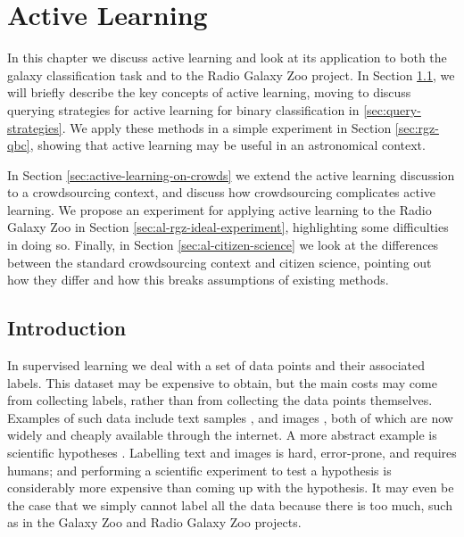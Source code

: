 
\chapter{Active Learning}
\label{cha:active-learning}

In this chapter we discuss active learning and look at its application to both
the galaxy classification task and to the Radio Galaxy Zoo project. In Section
\ref{sec:intro-active-learning}, we will briefly describe the key concepts of
active learning, moving to discuss querying strategies for active learning for
binary classification in \ref{sec:query-strategies}. We apply these methods in a
simple experiment in Section \ref{sec:rgz-qbc}, showing that active learning may
be useful in an astronomical context.

In Section \ref{sec:active-learning-on-crowds} we extend the active learning
discussion to a crowdsourcing context, and discuss how crowdsourcing complicates
active learning. We propose an experiment for applying active learning to the
Radio Galaxy Zoo in Section \ref{sec:al-rgz-ideal-experiment}, highlighting some
difficulties in doing so. Finally, in Section \ref{sec:al-citizen-science} we
look at the differences between the standard crowdsourcing context and citizen
science, pointing out how they differ and how this breaks assumptions of
existing methods.

\section{Introduction}
\label{sec:intro-active-learning}
    
    In supervised learning we deal with a set of data points and their
    associated labels. This dataset may be expensive to obtain, but the main
    costs may come from collecting labels, rather than from collecting the data
    points themselves. Examples of such data include text samples
    \citep{lewis94, mccallum98}, and images \citep{loy11, lintott08}, both of
    which are now widely and cheaply available through the internet. A more
    abstract example is scientific hypotheses \citep{king04}. Labelling text and
    images is hard, error-prone, and requires humans; and performing a
    scientific experiment to test a hypothesis is considerably more expensive
    than coming up with the hypothesis. It may even be the case that we simply
    cannot label all the data because there is too much, such as in the Galaxy
    Zoo \citep{lintott08} and Radio Galaxy Zoo \citep{banfield15} projects.

